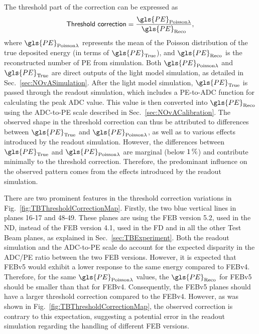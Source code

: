 The threshold part of the correction can be expressed as
\begin{equation}
\textsf{Threshold correction}=\frac{\gls{PE}_{\mathrm{Poisson}\lambda}}{\gls{PE}_{\mathrm{Reco}}},
\end{equation}
where $\gls{PE}_{\mathrm{Poisson}\lambda}$ represents the mean of the Poisson distribution of the true deposited energy (in terms of $\gls{PE}_{\mathrm{True}}$), and $\gls{PE}_{\mathrm{Reco}}$ is the reconstructed number of \gls{PE} from simulation. Both $\gls{PE}_{\mathrm{Poisson}\lambda}$ and $\gls{PE}_{\mathrm{True}}$ are direct outputs of the light model simulation, as detailed in Sec.~\ref{sec:NOvASimulation}. After the light model simulation, $\gls{PE}_{\mathrm{True}}$ is passed through the readout simulation, which includes a \gls{PE}-to-\gls{ADC} function for calculating the peak \gls{ADC} value. This value is then converted into $\gls{PE}_{\mathrm{Reco}}$ using the \gls{ADC}-to-\gls{PE} scale described in Sec.~\ref{sec:NOvACalibration}. The observed shape in the threshold correction can thus be attributed to differences between $\gls{PE}_{\mathrm{True}}$ and $\gls{PE}_{\mathrm{Poisson}\lambda}$, as well as to various effects introduced by the readout simulation. However, the differences between $\gls{PE}_{\mathrm{True}}$ and $\gls{PE}_{\mathrm{Poisson}\lambda}$ are marginal (below $\unit[1]{\%}$) and contribute minimally to the threshold correction. Therefore, the predominant influence on the observed pattern comes from the effects introduced by the readout simulation.

There are two prominent features in the threshold correction variations in Fig.~\ref{fig:TBThresholdCorrectionMap}. Firstly, the two blue vertical lines in planes 16-17 and 48-49. These planes are using the \gls{FEB} version 5.2, used in the \gls{ND}, instead of  the \gls{FEB} version 4.1, used in the \gls{FD} and in all the other Test Beam planes, as explained in Sec.~\ref{sec:TBExperiment}. Both the readout simulation and the \gls{ADC}-to-\gls{PE} scale do account for the expected disparity in the \gls{ADC}/\gls{PE} ratio between the two \gls{FEB} versions. However, it is expected that \gls{FEB}v5 would exhibit a lower response to the same energy compared to \gls{FEB}v4. Therefore, for the same $\gls{PE}_{\mathrm{Poisson}\lambda}$ values, the $\gls{PE}_{\mathrm{Reco}}$ for \gls{FEB}v5 should be smaller than that for \gls{FEB}v4. Consequently, the \gls{FEB}v5 planes should have a larger threshold correction compared to the \gls{FEB}v4. However, as was shown in Fig.~\ref{fig:TBThresholdCorrectionMap}, the observed correction is contrary to this expectation, suggesting a potential error in the readout simulation regarding the handling of different \gls{FEB} versions.

